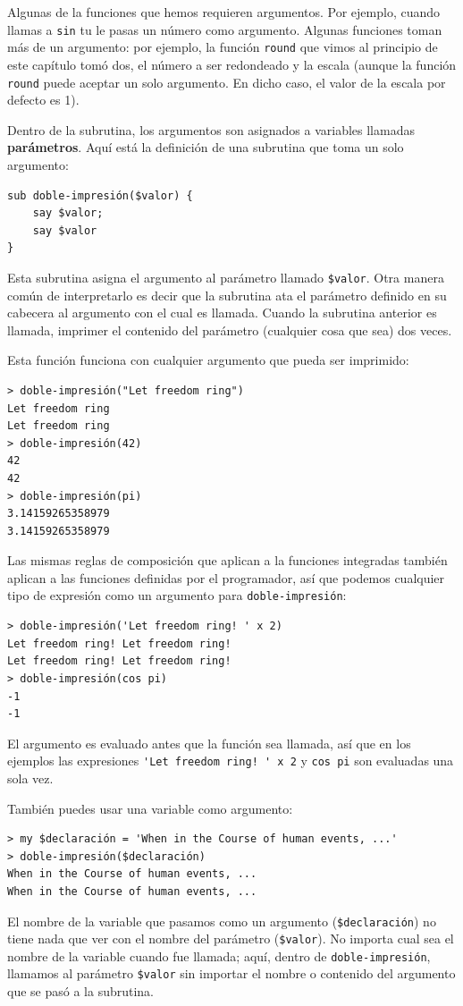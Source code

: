 Algunas de la funciones que hemos requieren argumentos. Por ejemplo,
cuando llamas a {\tt sin} tu le pasas un número como argumento. Algunas
funciones toman más de un argumento: por ejemplo, la función {\tt round}
que vimos al principio de este capítulo tomó dos, el número a ser redondeado
y la escala (aunque la función {\tt round} puede aceptar un solo 
argumento. En dicho caso, el valor de la escala por defecto es 1).
 
Dentro de la subrutina, los argumentos son asignados a variables llamadas 
{\bf parámetros}. Aquí está la definición de una subrutina que toma un 
solo argumento:

\begin{verbatim}
sub doble-impresión($valor) {
    say $valor;
    say $valor
}
\end{verbatim}
%
Esta subrutina asigna el argumento al parámetro llamado
\verb|$valor|. Otra manera común de interpretarlo es decir que
la subrutina ata el parámetro definido en su cabecera al argumento
con el cual es llamada. Cuando la subrutina anterior es llamada, 
imprimer el contenido del parámetro (cualquier cosa que sea) dos
veces.

Esta función funciona con cualquier argumento que pueda ser
imprimido:

\begin{verbatim}
> doble-impresión("Let freedom ring")
Let freedom ring
Let freedom ring
> doble-impresión(42)
42
42
> doble-impresión(pi)
3.14159265358979
3.14159265358979
\end{verbatim}
%
Las mismas reglas de composición que aplican a la funciones integradas 
también aplican a las funciones definidas por el programador, así que podemos
cualquier tipo de expresión como un argumento para \verb|doble-impresión|:

\begin{verbatim}
> doble-impresión('Let freedom ring! ' x 2)
Let freedom ring! Let freedom ring! 
Let freedom ring! Let freedom ring! 
> doble-impresión(cos pi)
-1
-1
\end{verbatim}
%
El argumento es evaluado antes que la función sea llamada, 
así que en los ejemplos las expresiones \verb"'Let freedom ring! ' x 2" 
y {\tt cos pi} son evaluadas una sola vez.

También puedes usar una variable como argumento:

\begin{verbatim}
> my $declaración = 'When in the Course of human events, ...'
> doble-impresión($declaración)
When in the Course of human events, ...
When in the Course of human events, ...
\end{verbatim}
%
El nombre de la variable que pasamos como un argumento (\verb|$declaración|)
no tiene nada que ver con el nombre del parámetro (\verb|$valor|). No
importa cual sea el nombre de la variable cuando fue llamada;
aquí, dentro de \verb|doble-impresión|, llamamos al parámetro 
\verb|$valor| sin importar el nombre o contenido del argumento que se
pasó a la subrutina.



